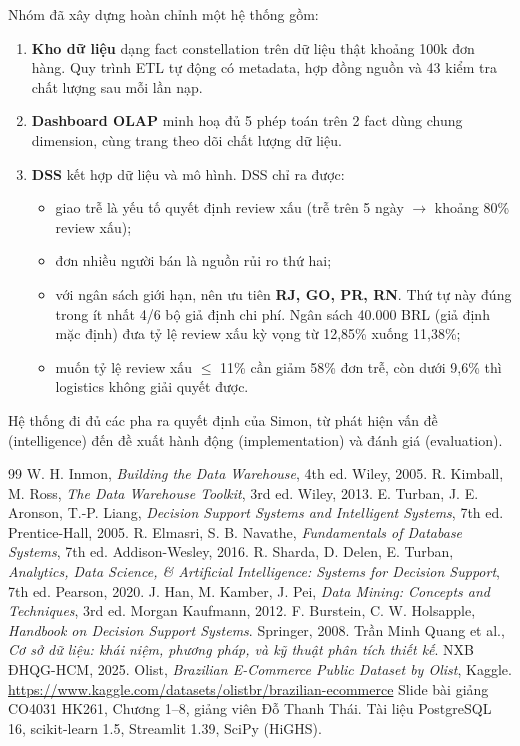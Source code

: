 \documentclass[12pt,a4paper]{report}
\renewcommand{\_}{\oldunderscore\allowbreak}
\begin{document}
Nhóm đã xây dựng hoàn chỉnh một hệ thống gồm:
\begin{enumerate}
\item \textbf{Kho dữ liệu} dạng fact constellation trên dữ liệu thật khoảng 100k đơn hàng. Quy trình ETL tự động có metadata, hợp đồng nguồn và 43 kiểm tra chất lượng sau mỗi lần nạp.
\item \textbf{Dashboard OLAP} minh hoạ đủ 5 phép toán trên 2 fact dùng chung dimension, cùng trang theo dõi chất lượng dữ liệu.
\item \textbf{DSS} kết hợp dữ liệu và mô hình. DSS chỉ ra được:
  \begin{itemize}
  \item giao trễ là yếu tố quyết định review xấu (trễ trên 5 ngày $\rightarrow$ khoảng 80\% review xấu);
  \item đơn nhiều người bán là nguồn rủi ro thứ hai;
  \item với ngân sách giới hạn, nên ưu tiên \textbf{RJ, GO, PR, RN}. Thứ tự này đúng trong ít nhất 4/6 bộ giả định chi phí. Ngân sách 40.000 BRL (giả định mặc định) đưa tỷ lệ review xấu kỳ vọng từ 12,85\% xuống 11,38\%;
  \item muốn tỷ lệ review xấu $\le$ 11\% cần giảm 58\% đơn trễ, còn dưới 9,6\% thì logistics không giải quyết được.
  \end{itemize}
\end{enumerate}

Hệ thống đi đủ các pha ra quyết định của Simon, từ phát hiện vấn đề (intelligence) đến đề xuất hành động (implementation) và đánh giá (evaluation).

\begin{thebibliography}{99}
 W. H. Inmon, \emph{Building the Data Warehouse}, 4th ed. Wiley, 2005.
 R. Kimball, M. Ross, \emph{The Data Warehouse Toolkit}, 3rd ed. Wiley, 2013.
 E. Turban, J. E. Aronson, T.-P. Liang, \emph{Decision Support Systems and Intelligent Systems}, 7th ed. Prentice-Hall, 2005.
 R. Elmasri, S. B. Navathe, \emph{Fundamentals of Database Systems}, 7th ed. Addison-Wesley, 2016.
 R. Sharda, D. Delen, E. Turban, \emph{Analytics, Data Science, \& Artificial Intelligence: Systems for Decision Support}, 7th ed. Pearson, 2020.
 J. Han, M. Kamber, J. Pei, \emph{Data Mining: Concepts and Techniques}, 3rd ed. Morgan Kaufmann, 2012.
 F. Burstein, C. W. Holsapple, \emph{Handbook on Decision Support Systems}. Springer, 2008.
 Trần Minh Quang et al., \emph{Cơ sở dữ liệu: khái niệm, phương pháp, và kỹ thuật phân tích thiết kế}. NXB ĐHQG-HCM, 2025.
 Olist, \emph{Brazilian E-Commerce Public Dataset by Olist}, Kaggle. \url{https://www.kaggle.com/datasets/olistbr/brazilian-ecommerce}
 Slide bài giảng CO4031 HK261, Chương 1--8, giảng viên Đỗ Thanh Thái.
 Tài liệu PostgreSQL 16, scikit-learn 1.5, Streamlit 1.39, SciPy (HiGHS).
\end{thebibliography}
\end{document}
